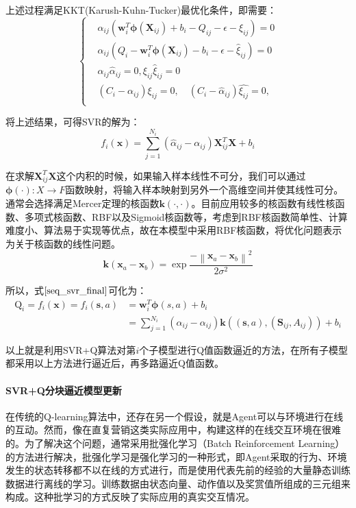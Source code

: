 上述过程满足KKT(Karush-Kuhn-Tucker)最优化条件，即需要：
\begin{equation}
\label{seq_kkt}
\left\{\begin{matrix}
&\alpha_{ij}(\bm{w}_{i}^{T} \bm{\phi}(\bm{X}_{ij}) + b_{i} - Q_{ij} - \epsilon - \xi_{ij})=0
\\ 
&\hat{\alpha}_{ij}(Q_{i} - \bm{w}_{i}^{T} \bm{\phi}(\bm{X}_{ij}) - b_{i} - \epsilon - \hat{\xi}_{ij})=0
\\ 
&\alpha_{ij}\hat{\alpha}_{ij}=0, \xi_{ij}\hat{\xi}_{ij}=0
\\ 
&(C_{i}-\alpha_{ij})\xi_{ij}=0,\quad (C_{i}-\hat{\alpha}_{ij})\hat{\xi_{ij}}=0,
\\
\end{matrix}\right.
\end{equation}

将上述结果，可得SVR的解为：
\begin{equation}
\label{seq_svr_final}
f_{i}(\bm{x})=\sum_{j=1}^{N_{i}}(\hat{\alpha}_{ij}-\alpha_{ij})\bm{X}_{ij}^{T}\bm{X}+b_{i}
\end{equation}

在求解$\bm{X}_{ij}^{T}\bm{X}$这个内积的时候，如果输入样本线性不可分，我们可以通过$\bm{\phi}(\cdot):X \to F$函数映射，将输入样本映射到另外一个高维空间并使其线性可分。通常会选择满足Mercer定理的核函数$\bm{k}(\cdot,\cdot)$。目前应用较多的核函数有线性核函数、多项式核函数、RBF以及Sigmoid核函数等，考虑到RBF核函数简单性、计算难度小、算法易于实现等优点，故在本模型中采用RBF核函数，将优化问题表示为关于核函数的线性问题。
\begin{equation}
\bm{k}(\bm{x}_{a} - \bm{x}_{b}) = \exp{\frac{-\left \| \bm{x}_{a} - \bm{x}_{b} \right \|^{2}}{2\sigma^{2}}}
\end{equation}

所以，式$\eqref{seq_svr_final}$可化为：
\begin{equation}\label{seq_final}
\begin{aligned}
\text{Q}_{i}=f_{i}(\bm{x})=f_{i}(\bm{s},a)&=\bm{w}_{i}^{T} \bm{\phi}(s,a) + b_{i}\\
&=\sum_{j=1}^{N_{i}}(\hat{\alpha}_{ij}-\alpha_{ij})\bm{k}((\bm{s},a),(\bm{S}_{ij},A_{ij}))+b_{i}
\end{aligned}
\end{equation}

以上就是利用SVR+Q算法对第$i$个子模型进行Q值函数逼近的方法，在所有子模型都采用以上方法进行逼近后，再多路逼近Q值函数。

\paragraph{SVR+Q分块逼近模型更新}
在传统的Q-learning算法中，还存在另一个假设，就是Agent可以与环境进行在线的互动。然而，像在直复营销这类实际应用中，构建这样的在线交互环境在很难的。为了解决这个问题，通常采用批强化学习（Batch Reinforcement Learning）的方法进行解决\citep{lange2012batch}，批强化学习是强化学习的一种形式，即Agent采取的行为、环境发生的状态转移都不以在线的方式进行，而是使用代表先前的经验的大量静态训练数据进行离线的学习。训练数据由状态向量、动作值以及奖赏值所组成的三元组来构成。这种批学习的方式反映了实际应用的真实交互情况。

